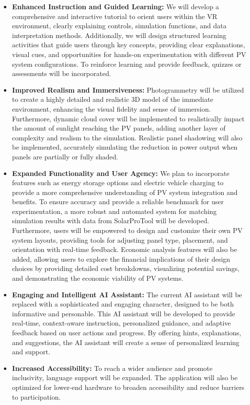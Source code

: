 \documentclass[draft, final]{vutinfth} %
\begin{document}
\begin{itemize}
    \item \textbf{Enhanced Instruction and Guided Learning:} We will develop a comprehensive and interactive tutorial to orient users within the VR environment, clearly explaining controls, simulation functions, and data interpretation methods.  Additionally, we will design structured learning activities that guide users through key concepts, providing clear explanations, visual cues, and opportunities for hands-on experimentation with different PV system configurations. To reinforce learning and provide feedback, quizzes or assessments will be incorporated.
    \item \textbf{Improved Realism and Immersiveness:} Photogrammetry will be utilized to create a highly detailed and realistic 3D model of the immediate environment, enhancing the visual fidelity and sense of immersion. Furthermore, dynamic cloud cover will be implemented to realistically impact the amount of sunlight reaching the PV panels, adding another layer of complexity and realism to the simulation. Realistic panel shadowing will also be implemented, accurately simulating the reduction in power output when panels are partially or fully shaded.
    \item \textbf{Expanded Functionality and User Agency:} We plan to incorporate features such as energy storage options and electric vehicle charging to provide a more comprehensive understanding of PV system integration and benefits. To ensure accuracy and provide a reliable benchmark for user experimentation, a more robust and automated system for matching simulation results with data from SolarProTool will be developed.  Furthermore, users will be empowered to design and customize their own PV system layouts, providing tools for adjusting panel type, placement, and orientation with real-time feedback. Economic analysis features will also be added, allowing users to explore the financial implications of their design choices by providing detailed cost breakdowns, visualizing potential savings, and demonstrating the economic viability of PV systems.
    \item \textbf{Engaging and Intelligent AI Assistant:} The current AI assistant will be replaced with a sophisticated and engaging character, designed to be both informative and personable. This AI assistant will be developed to provide real-time, context-aware instruction, personalized guidance, and adaptive feedback based on user actions and progress. By offering hints, explanations, and suggestions, the AI assistant will create a sense of personalized learning and support.
    \item \textbf{Increased Accessibility:} To reach a wider audience and promote inclusivity, language support will be expanded. The application will also be optimized for lower-end hardware to broaden accessibility and reduce barriers to participation.
\end{itemize}
\end{document}
